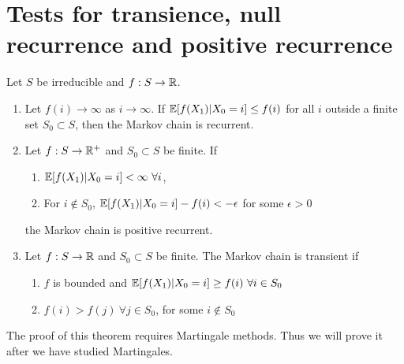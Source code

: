 \documentclass[all-lectures.tex]{subfiles}
\begin{document}

\setcounter{section}{3}
\setcounter{subsection}{0}

\section*{}
\chr
\section{Tests for transience, null recurrence and positive recurrence}
\begin{thm} \label{prop:markov_chain_class_tests}
Let $S$ be irreducible and $f: S \rightarrow \mathbb{R}$. 
\begin{enumerate}
\item Let $f(i)\rightarrow \infty$ as $i\rightarrow \infty$. If $\mathbb{E}[f(X_1)|X_0 = i] \leq f(i)$ for all $i$ outside a finite set $S_0 \subset S$, then the Markov chain is recurrent. 
\item Let $f:S\rightarrow \mathbb{R}^+$ and $S_0 \subset S$ be finite. If 
	\begin{enumerate}
	\item  $\E[f(X_1)|X_0 = i] < \infty \ \forall i$,
	\item For $i \notin S_0$, $\mathbb{E}[f(X_1)|X_0 = i] - f(i) < -\epsilon$ for some $\epsilon > 0$
	\end{enumerate}
	 the Markov chain is positive recurrent. 
\item Let $f:S\rightarrow \mathbb{R}$ and $S_0 \subset S$ be finite.	The Markov chain is transient if
	\begin{enumerate}
	\item  $f$ is bounded and $\E[f(X_1)|X_0= i] \geq f(i)\ \forall i \in S_0$
	\item $f(i) > f(j)\ \forall j\in S_0$, for some $i\notin S_0$
	\end{enumerate}	
\end{enumerate}
\end{thm}
\indent The proof of this theorem requires Martingale methods. Thus we will prove it after we have studied Martingales. \\
\end{document}
